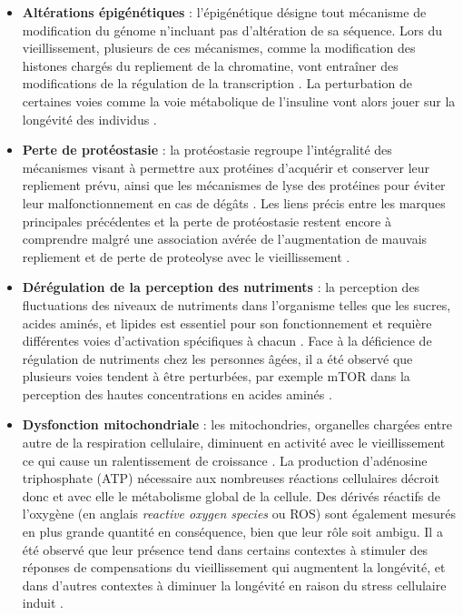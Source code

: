 \begin{itemize}
    \item \textbf{Altérations épigénétiques} : l'épigénétique désigne tout mécanisme de modification du génome n'incluant pas d'altération de sa séquence. Lors du vieillissement, plusieurs de ces mécanismes, comme la modification des histones chargés du repliement de la chromatine, vont entraîner des modifications de la régulation de la transcription \cite{Fraga2007Aug}. La perturbation de certaines voies comme la voie métabolique de l'insuline vont alors jouer sur la longévité des individus \cite{Jin2011Aug}.
    \item \textbf{Perte de protéostasie} : la protéostasie regroupe l'intégralité des mécanismes visant à permettre aux protéines d'acquérir et conserver leur repliement prévu, ainsi que les mécanismes de lyse des protéines pour éviter leur malfonctionnement en cas de dégâts \cite{Koga2011Apr}. Les liens précis entre les marques principales précédentes et la perte de protéostasie restent encore à comprendre malgré une association avérée de l'augmentation de mauvais repliement et de perte de proteolyse avec le vieillissement \cite{Koga2011Apr}.
    \item \textbf{Dérégulation de la perception des nutriments} : la perception des fluctuations des niveaux de nutriments dans l'\gls{organisme} telles que les sucres, acides aminés, et lipides est essentiel pour son fonctionnement et requière différentes voies d'activation spécifiques à chacun \cite{Houtkooper2010Jul}. Face à la déficience de régulation de nutriments chez les personnes âgées, il a été observé que plusieurs voies tendent à être perturbées, par exemple mTOR dans la perception des hautes concentrations en acides aminés \cite{Laplante2012Apr}.
    \item \textbf{Dysfonction mitochondriale} : les mitochondries, organelles chargées entre autre de la respiration cellulaire, diminuent en activité avec le vieillissement ce qui cause un ralentissement de croissance \cite{Green2011Aug}. La production d'adénosine triphosphate (ATP) nécessaire aux nombreuses réactions cellulaires décroit donc et avec elle le métabolisme global de la cellule. Des dérivés réactifs de l'oxygène (en anglais \textit{reactive oxygen species} ou ROS) sont également mesurés en plus grande quantité en conséquence, bien que leur rôle soit ambigu. Il a été observé que leur présence tend dans certains contextes à stimuler des réponses de compensations du vieillissement qui augmentent la longévité, et dans d'autres contextes à diminuer la longévité en raison du stress cellulaire induit \cite{Ziegler2015Feb}.

\end{itemize}
